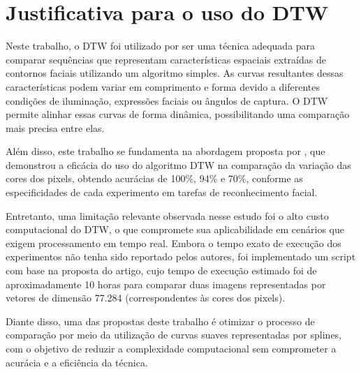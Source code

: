 \section{Justificativa para o uso do DTW}

Neste trabalho, o DTW foi utilizado por ser uma técnica adequada para comparar sequências que representam características espaciais extraídas de contornos faciais utilizando um algoritmo simples. As curvas resultantes dessas características podem variar em comprimento e forma devido a diferentes condições de iluminação, expressões faciais ou ângulos de captura. O DTW permite alinhar essas curvas de forma dinâmica, possibilitando uma comparação mais precisa entre elas.

Além disso, este trabalho se fundamenta na abordagem proposta por \citet{DTW_LSTM}, que demonstrou a eficácia do uso do algoritmo DTW na comparação da variação das cores dos pixels, obtendo acurácias de 100\%, 94\% e 70\%, conforme as especificidades de cada experimento em tarefas de reconhecimento facial.

Entretanto, uma limitação relevante observada nesse estudo foi o alto custo computacional do DTW, o que compromete sua aplicabilidade em cenários que exigem processamento em tempo real. Embora o tempo exato de execução dos experimentos não tenha sido reportado pelos autores, foi implementado um script com base na proposta do artigo, cujo tempo de execução estimado foi de aproximadamente 10 horas para comparar duas imagens representadas por vetores de dimensão 77.284 (correspondentes às cores dos pixels).

Diante disso, uma das propostas deste trabalho é otimizar o processo de comparação por meio da utilização de curvas suaves representadas por splines, com o objetivo de reduzir a complexidade computacional sem comprometer a acurácia e a eficiência da técnica.

